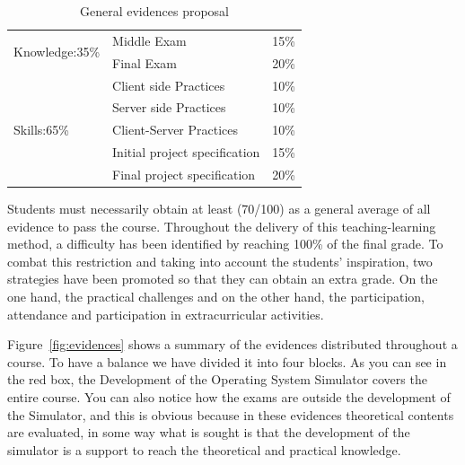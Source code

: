 \begin{table}
    \begin{center}
        \caption{General evidences proposal}
        \label{table:learningEvidences}
        \begin{tabular}{|l|l|l|}
        \hline
        \multicolumn{1}{|c|}{\multirow{2}{*}{Knowledge:35\%}} & Middle Exam                   & 15\% \\ \cline{2-3} 
        \multicolumn{1}{|c|}{}                           & Final Exam                    & 20\% \\ \hline
        \multirow{5}{*}{Skills:65\%}                     & Client side Practices         & 10\% \\ \cline{2-3} 
                                                         & Server side Practices         & 10\% \\ \cline{2-3} 
                                                         & Client-Server Practices       & 10\% \\ \cline{2-3} 
                                                         & Initial project specification & 15\% \\ \cline{2-3} 
                                                         & Final project specification   & 20\% \\ \hline
        \end{tabular}
    \end{center}
\end{table}    


Students must necessarily obtain at least (70/100) as a general average of all evidence 
to pass the course. Throughout the delivery of this teaching-learning method, a 
difficulty has been identified by reaching 100\% of the final grade. To combat this 
restriction and taking into account the students' inspiration, two strategies have 
been promoted so that they can obtain an extra grade. On the one hand, the practical 
challenges and on the other hand, the participation, attendance and participation in 
extracurricular activities.

Figure~\ref{fig:evidences} shows a summary of the evidences distributed throughout a 
course. To have a balance we have divided it into four blocks. As you can see in the red 
box, the Development of the Operating System Simulator covers the entire course. 
You can also notice how the exams are outside the development of the Simulator, and this 
is obvious because in these evidences theoretical contents are evaluated, in some way 
what is sought is that the development of the simulator is a support to reach the 
theoretical and practical knowledge.

